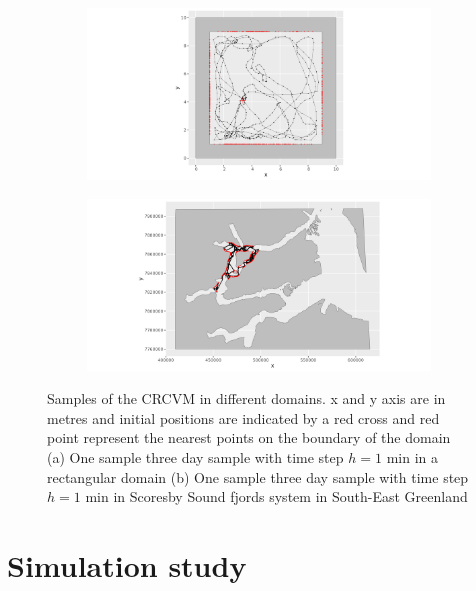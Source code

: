 \documentclass[11pt]{article}
\newcommand {\1}{\mathbb{1}}
\begin{document}
\begin{figure}[H]
	\centering
	\begin{subfigure}{0.48\textwidth}
		\centering
		\includegraphics[scale=0.4]{images/simulation study/illustrative_sample_rect.png}
		\caption{}
	\end{subfigure}
	\begin{subfigure}{0.48\textwidth}
		\centering
		\includegraphics[scale=0.4]{images/simulation study/illustrative_sample_fjords.png}
		\caption{}
	\end{subfigure}
	\caption{Samples of the CRCVM in different domains. x and y axis are in metres and initial positions are indicated by a red cross and red point represent the nearest points on the boundary of the domain (a) One sample three day sample with time step $h=1$ min in a rectangular domain (b) One sample three day sample with time step $h=1$ min in Scoresby Sound fjords system in South-East Greenland}
	\label{fig: samples_rect_CRCVM}
\end{figure}




\section{Simulation study}
\end{document}
